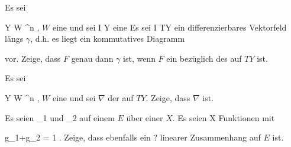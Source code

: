 {}
{

Es sei

\mavergleichskette
{\vergleichskette
{ Y
}
{ \subseteq }{ W
}
{ \subseteq }{ \R^n
}
{    }{
}
{   }{
}
}
{}{}{,}
$W$
eine
und sei
\maabb {\gamma} { I } { Y
} {}
eine
Es sei
 { I } { TY
} {}
ein differenzierbares Vektorfeld längs $\gamma$, d.h. es liegt ein kommutatives Diagramm

 {  }

vor. Zeige, dass $F$ genau dann
$\gamma$ ist, wenn $F$ ein
bezüglich des
 {} {}
auf $TY$ ist.

}
{} {}

{}
{

Es sei

\mavergleichskette
{\vergleichskette
{ Y
}
{ \subseteq }{ W
}
{ \subseteq }{ \R^n
}
{    }{
}
{   }{
}
}
{}{}{,}
$W$
eine
und sei $\nabla$ der
 {} {}
auf $TY$. Zeige, dass $\nabla$
ist.

}
{} {}

{}
{

Es seien
\mathkor {} {\nabla_1} {und} {\nabla_2} {}
auf einem
$E$ über einer
$X$. Es seien
 { X } { \R
} {}
Funktionen mit

\mavergleichskette
{\vergleichskette
{ g_1+g_2
}
{ = }{ 1
}
{  }{
}
{    }{
}
{   }{
}
}
{}{}{.}
Zeige, dass
 ebenfalls ein
 {?} {}
linearer  Zusammenhang auf $E$  ist.

}
{} {}


